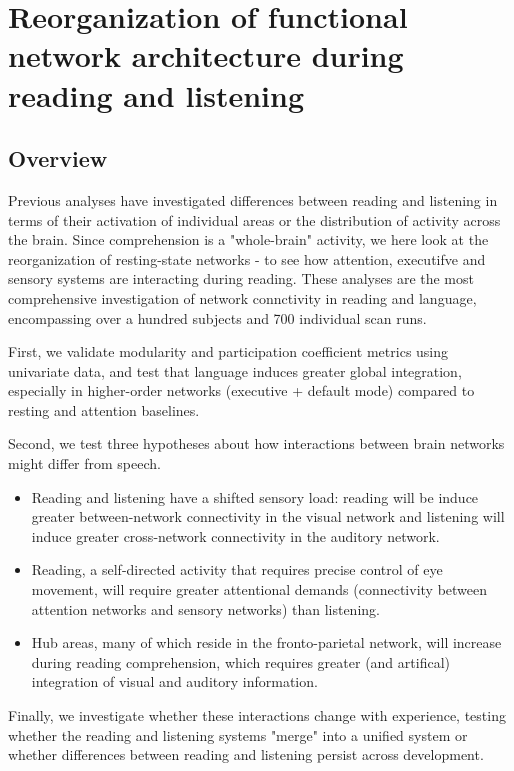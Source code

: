 \chapter{Reorganization of functional network architecture during reading and listening}

\section{Overview}

Previous analyses have investigated differences between reading and listening in terms of their activation of individual areas or the distribution of activity across the brain. Since comprehension is a "whole-brain" activity, we here look at the reorganization of resting-state networks - to see how attention, executifve and sensory systems are interacting during reading.  These analyses are the most comprehensive investigation of network connctivity in reading and language, encompassing over a hundred subjects and 700 individual scan runs. 

First, we validate modularity and participation coefficient metrics using univariate data, and test that language induces greater global integration, especially in higher-order networks (executive + default mode) compared to resting and attention baselines.

Second, we test three hypotheses about how interactions between brain networks might differ from speech.

\begin{itemize}
	\item Reading and listening have a shifted sensory load: reading will be induce greater between-network connectivity in the visual network and listening will induce greater cross-network connectivity in the auditory network.  
	\item Reading, a self-directed activity that requires precise control of eye movement, will require greater attentional demands (connectivity between attention networks and sensory networks) than listening. 
	\item Hub areas, many of which reside in the fronto-parietal network, will increase during reading comprehension, which requires greater (and artifical) integration of visual and auditory information.
\end{itemize}

Finally, we investigate whether these interactions change with experience, testing whether the reading and listening systems "merge" into a unified system or whether differences between reading and listening persist across development.

